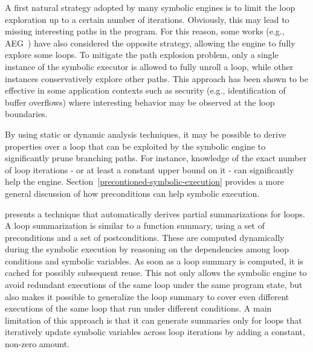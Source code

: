 A first natural strategy adopted by many symbolic engines is to limit the loop exploration up to a certain number of iterations. Obviously, this may lead to missing interesting paths in the program. For this reason, some works (e.g., {\sc AEG}~\cite{AEG-NDSS11}) have also considered the opposite strategy, allowing the engine to fully explore some loops. To mitigate the path explosion problem, only a single instance of the symbolic executor is allowed to fully unroll a loop, while other instances conservatively explore other paths. This approach has been shown to be effective in some application contexts such as security (e.g., identification of buffer overflows) where interesting behavior may be observed at the loop boundaries.

By using static or dynamic analysis techniques, it may be possible to derive properties over a loop that can be exploited by the symbolic engine to significantly prune branching paths. For instance, knowledge of the exact number of loop iterations - or at least a constant upper bound on it - can significantly help the engine. Section~\ref{precontioned-symbolic-execution} provides a more general discussion of how preconditions can help symbolic execution.

\cite{GL-ISSTA11} presents a technique that automatically derives partial summarizations for loops. A loop summarization is similar to a function summary, using a set of preconditions and a set of postconditions. These are computed dynamically during the symbolic execution by reasoning on the dependencies among loop conditions and symbolic variables. As soon as a loop summary is computed, it is cached for possibly subsequent reuse. This not only allows the symbolic engine to avoid redundant executions of the same loop under the same program state, but also makes it possible to generalize the loop summary to cover even different executions of the same loop that run under different conditions. A main limitation of this approach is that it can generate summaries only for loops that iteratively update symbolic variables across loop iterations by adding a constant, non-zero amount.

